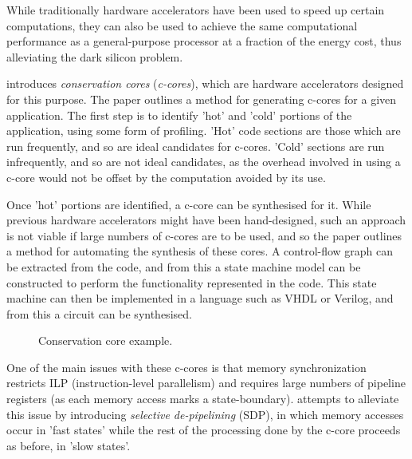 \documentclass{UoYCSproject}
\begin{document}
While traditionally hardware accelerators have been used to speed up certain computations, they can also be used to achieve the
same computational performance as a general-purpose processor at a fraction of the energy cost, thus alleviating the dark silicon
problem.

\cite{c-cores} introduces \textit{conservation cores} (\textit{c-cores}), which are hardware accelerators
designed for this purpose. The paper outlines a method for generating c-cores for a given application.
The first step is to identify 'hot' and 'cold' portions of the application, using some form of profiling.
'Hot' code sections are those which are run frequently, and so are ideal candidates for c-cores. 'Cold' sections
are run infrequently, and so are not ideal candidates, as the overhead involved in using a c-core would
not be offset by the computation avoided by its use.

Once 'hot' portions are identified, a c-core can be synthesised for it. While previous hardware accelerators
might have been hand-designed, such an approach is not viable if large numbers of c-cores are to be used, and so
the paper outlines a method for automating the synthesis of these cores. A control-flow graph can be extracted
from the code, and from this a state machine model can be constructed to perform the functionality represented
in the code. This state machine can then be implemented in a language such as VHDL or Verilog, and from this a circuit
can be synthesised.

\begin{figure}[h]
\caption{Conservation core example. \cite{c-cores}}
\end{figure}

One of the main issues with these c-cores is that memory synchronization restricts ILP (instruction-level parallelism)
and requires large numbers of pipeline registers (as each memory access marks a state-boundary). \cite{eco-cores} attempts
to alleviate this issue by introducing \textit{selective de-pipelining} (SDP), in which memory accesses occur in 'fast states'
while the rest of the processing done by the c-core proceeds as before, in 'slow states'.
\end{document}
